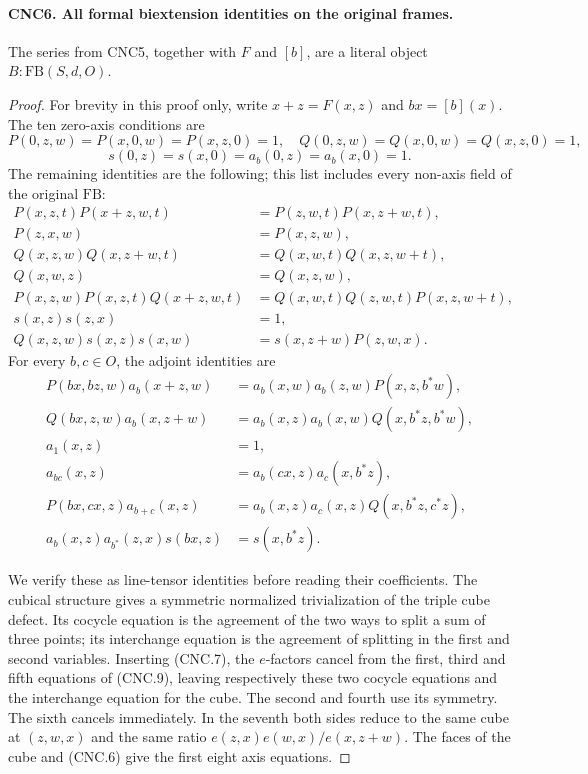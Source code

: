\paragraph{CNC6. All formal biextension identities on the original frames.}
\label{claim:CNC6}
The series from CNC5, together with \(F\) and \([b]\), are a
literal object \(B:\mathrm{FB}(S,d,O)\).
\begin{proof}
For brevity in this proof only, write \(x+z=F(x,z)\) and
\(b x=[b](x)\).  The ten zero-axis conditions are
\[
 P(0,z,w)=P(x,0,w)=P(x,z,0)=1,
 \quad Q(0,z,w)=Q(x,0,w)=Q(x,z,0)=1,
\]
\[
 s(0,z)=s(x,0)=a_b(0,z)=a_b(x,0)=1.                            \tag{CNC.8}
\]
The remaining identities are the following; this list includes every
non-axis field of the original \(\mathrm{FB}\):
\[
\begin{aligned}
 P(x,z,t)P(x+z,w,t)&=P(z,w,t)P(x,z+w,t),\\
 P(z,x,w)&=P(x,z,w),\\
 Q(x,z,w)Q(x,z+w,t)&=Q(x,w,t)Q(x,z,w+t),\\
 Q(x,w,z)&=Q(x,z,w),\\
 P(x,z,w)P(x,z,t)Q(x+z,w,t)
   &=Q(x,w,t)Q(z,w,t)P(x,z,w+t),\\
 s(x,z)s(z,x)&=1,\\
 Q(x,z,w)s(x,z)s(x,w)&=s(x,z+w)P(z,w,x).
\end{aligned}                                                   \tag{CNC.9}
\]
For every \(b,c\in O\), the adjoint identities are
\[
\begin{aligned}
 P(bx,bz,w)a_b(x+z,w)
   &=a_b(x,w)a_b(z,w)P(x,z,b^*w),\\
 Q(bx,z,w)a_b(x,z+w)
   &=a_b(x,z)a_b(x,w)Q(x,b^*z,b^*w),\\
 a_1(x,z)&=1,\\
 a_{bc}(x,z)&=a_b(cx,z)a_c(x,b^*z),\\
 P(bx,cx,z)a_{b+c}(x,z)
   &=a_b(x,z)a_c(x,z)Q(x,b^*z,c^*z),\\
 a_b(x,z)a_{b^*}(z,x)s(bx,z)&=s(x,b^*z).
\end{aligned}                                                   \tag{CNC.10}
\]

We verify these as line-tensor identities before reading their
coefficients.  The cubical structure gives a symmetric normalized
trivialization of the triple cube defect.  Its cocycle equation is the
agreement of the two ways to split a sum of three points; its
interchange equation is the agreement of splitting in the first and
second variables.  Inserting (CNC.7), the \(e\)-factors cancel from
the first, third and fifth equations of (CNC.9), leaving respectively
these two cocycle equations and the interchange equation for the cube.
The second and fourth use its symmetry.  The sixth cancels immediately.
In the seventh both sides reduce to the same cube at \((z,w,x)\)
and the same ratio
\(e(z,x)e(w,x)/e(x,z+w)\).  The faces of the cube and (CNC.6)
give the first eight axis equations.


\end{proof}
